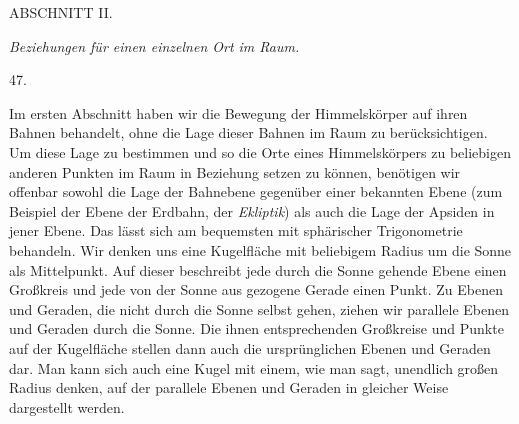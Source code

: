 \clearpage
{}
\begin{center}
{\large ABSCHNITT II.}\par\medskip
\emph{Beziehungen für einen einzelnen Ort im Raum.}\par\bigskip
\hypertarget{native-065-article047}{}47.
\end{center}
Im ersten Abschnitt haben wir die Bewegung der Himmelskörper auf ihren Bahnen behandelt, ohne die Lage dieser Bahnen im Raum zu berücksichtigen. Um diese Lage zu bestimmen und so die Orte eines Himmelskörpers zu beliebigen anderen Punkten im Raum in Beziehung setzen zu können, benötigen wir offenbar sowohl die Lage der Bahnebene gegenüber einer bekannten Ebene (zum Beispiel der Ebene der Erdbahn, der \emph{Ekliptik}) als auch die Lage der Apsiden in jener Ebene. Das lässt sich am bequemsten mit sphärischer Trigonometrie behandeln. Wir denken uns eine Kugelfläche mit beliebigem Radius um die Sonne als Mittelpunkt. Auf dieser beschreibt jede durch die Sonne gehende Ebene einen Großkreis und jede von der Sonne aus gezogene Gerade einen Punkt. Zu Ebenen und Geraden, die nicht durch die Sonne selbst gehen, ziehen wir parallele Ebenen und Geraden durch die Sonne. Die ihnen entsprechenden Großkreise und Punkte auf der Kugelfläche stellen dann auch die ursprünglichen Ebenen und Geraden dar. Man kann sich auch eine Kugel mit einem, wie man sagt, unendlich großen Radius denken, auf der parallele Ebenen und Geraden in gleicher Weise dargestellt werden.

